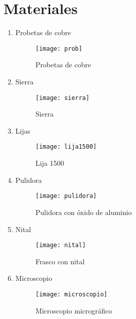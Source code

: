\documentclass[a4paper,12pt]{report}
\begin{document}
\section{Materiales}
\begin{enumerate}
\item Probetas de cobre
\begin{figure}[H]
\begin{center}
\texttt{[image: prob]}
\end{center}
\caption{Probetas de cobre}
\end{figure}
\item Sierra
\begin{figure}[H]
\begin{center}
\texttt{[image: sierra]}
\end{center}
\caption{Sierra}
\end{figure}
\item Lijas
\begin{figure}[H]
\begin{center}
\texttt{[image: lija1500]}
\end{center}
\caption{Lija 1500}
\end{figure}
\item Pulidora
\begin{figure}[H]
\begin{center}
\texttt{[image: pulidora]}
\end{center}
\caption{Pulidora con óxido de aluminio}
\end{figure}
\item Nital
\begin{figure}[H]
\begin{center}
\texttt{[image: nital]}
\end{center}
\caption{Frasco con nital}
\end{figure}
\item Microscopio
\begin{figure}[H]
\begin{center}
\texttt{[image: microscopio]}
\end{center}
\caption{Microscopio micrográfico}
\end{figure}
\end{enumerate}
\end{document}
